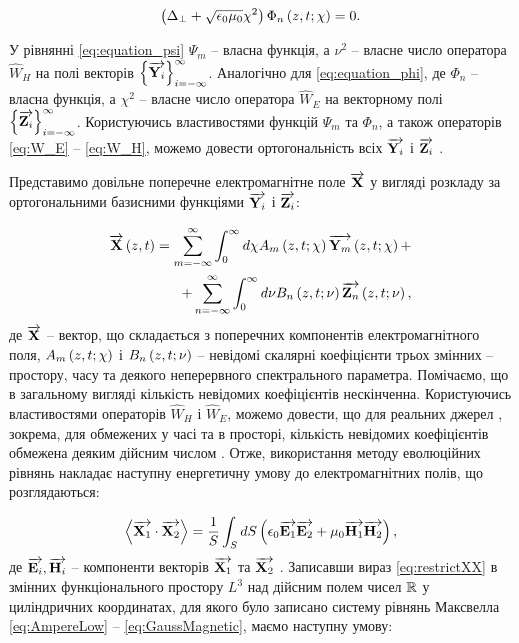 \begin{equation} \label{eq:equation_phi}
\left( \Delta_\perp + \sqrt{\epsilon_0 \mu_0} \chi^2 \right)
\Phi_n \left( z,t;\chi \right) = 0.
\end{equation}

У рівнянні \eqref{eq:equation_psi} $ \Psi_m $ -- власна функція, а $ \nu^2 $ 
-- власне число оператора $ \widehat{W}_H $ на полі векторів 
$ \left\{ \overrightarrow{\mathbf Y_i} \right\}_{i=-\infty}^\infty $. Аналогічно для 
\eqref{eq:equation_phi}, де $ \Phi_n $ -- власна функція, а $ \chi^2 $ -- 
власне число оператора $ \widehat{W}_E $ на векторному полі
$ \left\{ \overrightarrow{\mathbf Z_i} \right\}_{i=-\infty}^\infty $. Користуючись 
властивостями функцій $ \Psi_m $ та $ \Phi_n $, а також операторів 
\eqref{eq:W_E} -- \eqref{eq:W_H}, можемо довести ортогональність всіх 
$ \overrightarrow{\mathbf Y_i} $ і $ \overrightarrow{\mathbf Z_i} $ \cite{imp:Tretyakov1994}.

Представимо довільне поперечне електромагнітне поле $ \overrightarrow{\mathbf X} $ у вигляді 
розкладу за ортогональними базисними функціями $ \overrightarrow{\mathbf Y_i} $ і $ \overrightarrow{\mathbf Z_i} $:

\begin{equation} \begin{aligned} \label{eq:modalYZ}
\overrightarrow{\mathbf X} \left( z,t \right) = 
\sum_{m=-\infty}^\infty \int_0^\infty d \chi 
A_m \left( z,t;\chi \right) \overrightarrow{\mathbf Y_m} \left( z,t;\chi \right) + \\
+ \sum_{n=-\infty}^\infty \int_0^\infty d \nu 
B_n \left( z,t;\nu \right) \overrightarrow{\mathbf Z_n} \left( z,t;\nu \right),
\end{aligned} \end{equation}
%
де $ \overrightarrow{\mathbf X} $ -- вектор, що складається з поперечних компонентів 
електромагнітного поля, $ A_m \left( z,t;\chi \right) $ і $ B_n \left( z,t;\nu \right) $ --
невідомі скалярні коефіцієнти трьох змінних -- простору, часу та деякого 
неперервного спектрального параметра. Помічаємо, що в загальному вигляді 
кількість невідомих коефіцієнтів нескінченна. Користуючись властивостями 
операторів $ \widehat{W}_H $ і $ \widehat{W}_E $, можемо довести, що для 
реальних джерел \cite{imp:Legenkiy2010}, зокрема, для обмежених у часі та в 
просторі, кількість невідомих коефіцієнтів обмежена деяким дійсним числом
\cite{imp:Tretyakov2004, imp:Tretyakov2010}. Отже, використання 
методу еволюційних рівнянь накладає наступну енергетичну 
умову до електромагнітних полів, що розглядаються:

\begin{equation} \label{eq:restrictXX}
\left< \overrightarrow{\mathbf X_1} \cdot \overrightarrow{\mathbf X_2} \right> = \frac{1}{S} \int_{S} dS
\left( \epsilon_0 \overrightarrow{\mathbf E_1} \overrightarrow{\mathbf E_2} + \mu_0 \overrightarrow{\mathbf H_1} \overrightarrow{\mathbf H_2} \right),
\end{equation}
%
де $ \overrightarrow{\mathbf E_i}, \overrightarrow{\mathbf H_i} $ -- компоненти векторів $ \overrightarrow{\mathbf X_1} $ та 
$ \overrightarrow{\mathbf X_2} $ . Записавши вираз \eqref{eq:restrictXX} в змінних 
функціонального простору $ L^3 $ над дійсним полем чисел $ \mathbb{R} $ у 
циліндричних координатах, для якого було записано систему рівнянь Максвелла 
\eqref{eq:AmpereLow} -- \eqref{eq:GaussMagnetic}, маємо наступну умову:

